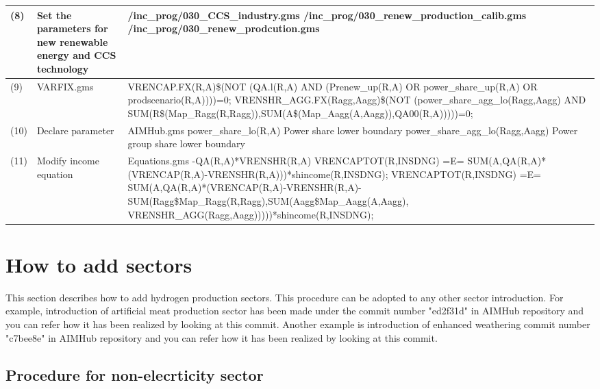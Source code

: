 \documentclass[10pt,a4paper,titlepage,dvipdfmx]{book}
\begin{document}
\begin{landscape}
\begin{tabularx}{\textwidth}{|
p{}|
p{}|
p{}|}
(8) & Set the parameters for new renewable energy and CCS technology & /inc\_prog/030\_CCS\_industry.gms \newline /inc\_prog/030\_renew\_production\_calib.gms \newline /inc\_prog/030\_renew\_prodcution.gms \\\hline 
(9) & VARFIX.gms & VRENCAP.FX(R,A)\$(NOT (QA.l(R,A) AND (Prenew\_up(R,A) OR power\_share\_up(R,A) OR prodscenario(R,A))))=0; \newline VRENSHR\_AGG.FX(Ragg,Aagg)\$(NOT (power\_share\_agg\_lo(Ragg,Aagg) AND SUM(R\$(Map\_Ragg(R,Ragg)),SUM(A\$(Map\_Aagg(A,Aagg)),QA00(R,A)))))=0; \\\hline 
(10) & Declare parameter & AIMHub.gms \newline power\_share\_lo(R,A)   Power share lower boundary \newline  power\_share\_agg\_lo(Ragg,Aagg)   Power group share lower boundary \\\hline 
(11) & Modify income equation &  Equations.gms \newline                -QA(R,A)*VRENSHR(R,A) \newline           VRENCAPTOT(R,INSDNG) =E= SUM(A,QA(R,A)*(VRENCAP(R,A)-VRENSHR(R,A)))*shincome(R,INSDNG); \newline     VRENCAPTOT(R,INSDNG) =E= SUM(A,QA(R,A)*(VRENCAP(R,A)-VRENSHR(R,A)-SUM(Ragg\$Map\_Ragg(R,Ragg),SUM(Aagg\$Map\_Aagg(A,Aagg), VRENSHR\_AGG(Ragg,Aagg)))))*shincome(R,INSDNG); \\\hline 
\end{tabularx}
\end{landscape}

\section{\label{sec:HowAddSec}How to add sectors}

This section describes how to add hydrogen production sectors. This procedure can be adopted to any other sector introduction. 
For example, introduction of artificial meat production sector has been made under the commit number  "ed2f31d"  in AIMHub repository and you can refer how it has been realized by looking at this commit.
Another example is introduction of enhanced weathering commit number "c7bee8e" in AIMHub repository and you can refer how it has been realized by looking at this commit.


\subsection{\label{subsec:ProNonEleSec}Procedure for non-elecrticity sector}
\end{document}
